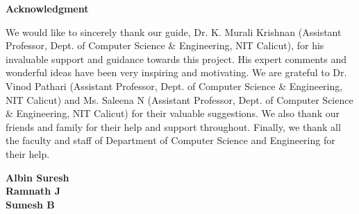 \pagestyle{empty}

\begin{center}
\Large\bf{Acknowledgment}
\end{center}
We would like to sincerely thank our guide, Dr. K. Murali Krishnan (Assistant Professor, Dept. of Computer Science \& Engineering, NIT Calicut), for his invaluable support and guidance towards this project. His expert comments and wonderful ideas have been very inspiring and motivating. We are grateful to Dr. Vinod Pathari (Assistant Professor, Dept. of Computer Science \& Engineering, NIT Calicut) and Ms. Saleena N (Assistant Professor, Dept. of Computer Science \& Engineering, NIT Calicut) for their valuable suggestions. We also thank our friends and family for their help and support throughout. Finally, we thank all the faculty and staff of Department of Computer Science and Engineering for their help.

\begin{flushright}
\bf Albin Suresh \\
\vspace{0.1cm}
\bf Ramnath J \\
\vspace{0.1cm}
\bf Sumesh B \\
\end{flushright}
